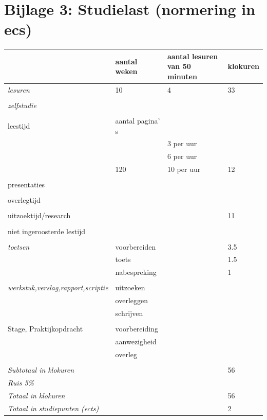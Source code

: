 \documentclass[titlepage,a4paper, 11pt]{article}
\begin{document}
\section{Bijlage 3: Studielast (normering in ecs)}
\begin{tabular}{|l|p{3cm}|p{3cm}|p{2cm}|}
\hline
&aantal weken&aantal lesuren van 50 minuten&klokuren\\
\hline
\emph{lesuren}&10&4&33\\
\hline
&&&\\
\hline
\emph{zelfstudie}&&&\\
\hline
&&&\\
\hline
leestijd&aantal pagina' s&&\\
\hline
&& 3 per uur&\\
\hline
&& 6 per uur&\\
\hline
&120& 10 per uur&12\\
\hline
&&&\\
\hline
presentaties&&&\\
\hline
&&&\\
\hline
overlegtijd&&&\\
\hline
&&&\\
\hline
uitzoektijd/research&&&11\\
\hline
&&&\\
\hline
niet ingeroosterde lestijd&&&\\
\hline
&&&\\
\hline
\emph{toetsen}&voorbereiden&&3.5\\
\hline
&toets&&1.5\\
\hline
&nabespreking&&1\\
\hline
&&&\\
\hline
\emph{werkstuk,verslag,rapport,scriptie}&uitzoeken&&\\
\hline
&overleggen&&\\
\hline
&schrijven&&\\
\hline
&&&\\
\hline
Stage, Praktijkopdracht&voorbereiding&&\\
\hline
&aanwezigheid&&\\
\hline
&overleg&&\\
\hline
&&&\\
\hline
\emph{Subtotaal in klokuren}&&&56\\
\hline
\emph{Ruis 5\%}&&&\\
\hline
\emph{Totaal in klokuren}&&&56\\
\hline
\emph{Totaal in studiepunten (ects)}&&&2\\
\hline
\end{tabular}
\end{document}

